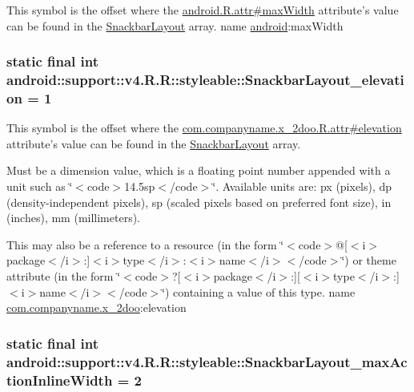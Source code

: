 This symbol is the offset where the \hyperlink{}{android.R.attr\#maxWidth} attribute's value can be found in the \hyperlink{classandroid_1_1support_1_1v4_1_1_r_1_1styleable_f3b816b2bb4147ee0c0cb792ff6d7454}{SnackbarLayout} array.  name \hyperlink{namespaceandroid}{android}:maxWidth \hypertarget{classandroid_1_1support_1_1v4_1_1_r_1_1styleable_b3f175a59ff6b35450d8d3ec1d9a90ac}{
\subsubsection[{SnackbarLayout\_\-elevation}]{\setlength{\rightskip}{0pt plus 5cm}static final int android::support::v4.R.R::styleable::SnackbarLayout\_\-elevation = 1}}
\label{classandroid_1_1support_1_1v4_1_1_r_1_1styleable_b3f175a59ff6b35450d8d3ec1d9a90ac}


This symbol is the offset where the \hyperlink{classcom_1_1companyname_1_1x__2doo_1_1_r_1_1attr_3661b6445a2b19a2dca2157df91648d2}{com.companyname.x\_\-2doo.R.attr\#elevation} attribute's value can be found in the \hyperlink{classandroid_1_1support_1_1v4_1_1_r_1_1styleable_f3b816b2bb4147ee0c0cb792ff6d7454}{SnackbarLayout} array.

Must be a dimension value, which is a floating point number appended with a unit such as \char`\"{}$<$code$>$14.5sp$<$/code$>$\char`\"{}. Available units are: px (pixels), dp (density-independent pixels), sp (scaled pixels based on preferred font size), in (inches), mm (millimeters). 

This may also be a reference to a resource (in the form \char`\"{}$<$code$>$@\mbox{[}$<$i$>$package$<$/i$>$:\mbox{]}$<$i$>$type$<$/i$>$:$<$i$>$name$<$/i$>$$<$/code$>$\char`\"{}) or theme attribute (in the form \char`\"{}$<$code$>$?\mbox{[}$<$i$>$package$<$/i$>$:\mbox{]}\mbox{[}$<$i$>$type$<$/i$>$:\mbox{]}$<$i$>$name$<$/i$>$$<$/code$>$\char`\"{}) containing a value of this type.  name \hyperlink{namespacecom_1_1companyname_1_1x__2doo}{com.companyname.x\_\-2doo}:elevation \hypertarget{classandroid_1_1support_1_1v4_1_1_r_1_1styleable_4e91b05c2e5aec649db0d92316818e0c}{
\subsubsection[{SnackbarLayout\_\-maxActionInlineWidth}]{\setlength{\rightskip}{0pt plus 5cm}static final int android::support::v4.R.R::styleable::SnackbarLayout\_\-maxActionInlineWidth = 2}}
\label{classandroid_1_1support_1_1v4_1_1_r_1_1styleable_4e91b05c2e5aec649db0d92316818e0c}



